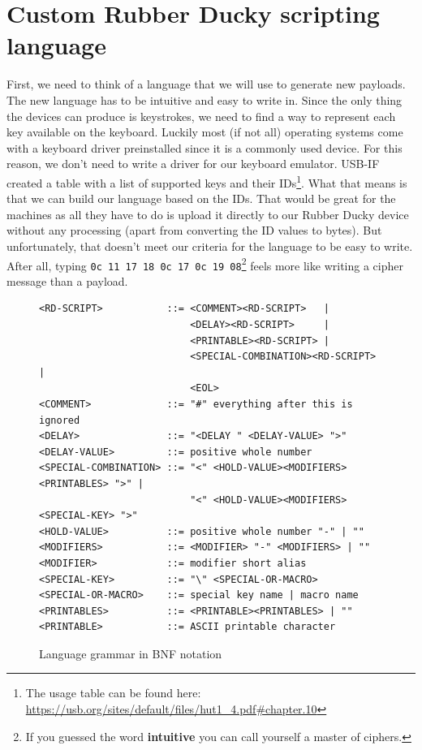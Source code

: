 \section{Custom Rubber Ducky scripting language}
\label{sec:design_language}
First, we need to think of a language that we will use to generate new payloads. The new language has to be intuitive and easy to write in. Since the only thing the devices can produce is keystrokes, we need to find a way to represent each key available on the keyboard. Luckily most (if not all) operating systems come with a keyboard driver preinstalled since it is a commonly used device. For this reason, we don't need to write a driver for our keyboard emulator. \mbox{USB-IF} created a table with a list of supported keys and their IDs\footnote{The usage table can be found here: \url{https://usb.org/sites/default/files/hut1_4.pdf\#chapter.10}}. What that means is that we can build our language based on the IDs. That would be great for the machines as all they have to do is upload it directly to our Rubber Ducky device without any processing (apart from converting the ID values to bytes). But unfortunately, that doesn't meet our criteria for the language to be easy to write. After all, typing \verb|0c 11 17 18 0c 17 0c 19 08|\footnote{If you guessed the word \textbf{intuitive} you can call yourself a master of ciphers.} feels more like writing a cipher message than a payload.

\begin{figure}[ht]
\begin{small}
\begin{verbatim}
<RD-SCRIPT>           ::= <COMMENT><RD-SCRIPT>   |
                          <DELAY><RD-SCRIPT>     |
                          <PRINTABLE><RD-SCRIPT> |
                          <SPECIAL-COMBINATION><RD-SCRIPT> |
                          <EOL>
<COMMENT>             ::= "#" everything after this is ignored
<DELAY>               ::= "<DELAY " <DELAY-VALUE> ">"
<DELAY-VALUE>         ::= positive whole number
<SPECIAL-COMBINATION> ::= "<" <HOLD-VALUE><MODIFIERS><PRINTABLES> ">" |
                          "<" <HOLD-VALUE><MODIFIERS><SPECIAL-KEY> ">"
<HOLD-VALUE>          ::= positive whole number "-" | ""
<MODIFIERS>           ::= <MODIFIER> "-" <MODIFIERS> | ""
<MODIFIER>            ::= modifier short alias
<SPECIAL-KEY>         ::= "\" <SPECIAL-OR-MACRO>
<SPECIAL-OR-MACRO>    ::= special key name | macro name
<PRINTABLES>          ::= <PRINTABLE><PRINTABLES> | ""
<PRINTABLE>           ::= ASCII printable character
\end{verbatim}
\end{small}
\caption{Language grammar in BNF notation}
\label{fig:language_grammar_bnf}
\end{figure}


